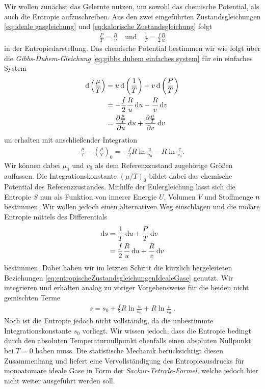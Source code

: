 Wir wollen zunächst das Gelernte nutzen, um sowohl das chemische Potential, als auch die Entropie aufzuschreiben. Aus den zwei eingeführten Zustandsgleichungen \eqref{eq:ideale gasgleichung} und \eqref{eq:kalorische Zustandsgleichung} folgt
\begin{align}
    \label{eq:entropischeZustandsgleichungenIdealeGase}
    \boxed{\frac{P}{T}=\frac{R}{v} \quad\text{und}\quad \frac{1}{T}=\frac{f}{2}\frac{R}{u}}
\end{align}
in der Entropiedarstellung. 
Das chemische Potential bestimmen wir wie folgt über die \emph{Gibbs-Duhem-Gleichung} \eqref{eq:gibbs duhem einfaches system} für ein einfaches System
\begin{align*}
    \mathop{}\!\mathrm{d} \left(\frac{\mu}{T}\right) & =u\mathop{}\!\mathrm{d}\left(\frac{1}{T}\right)+v\mathop{}\!\mathrm{d} \left(\frac{P}{T}\right)                                    \\
                                     & =-\frac{f}{2}\frac{R}{u}\mathop{}\!\mathrm{d} u-\frac{R}{v}\mathop{}\!\mathrm{d} v                                                 \\
                                     & =\frac{\partial \frac{\mu}{T}}{\partial u}\mathop{}\!\mathrm{d} u+\frac{\partial \frac{\mu}{T}}{\partial v}\mathop{}\!\mathrm{d} v
\end{align*}
un erhalten mit anschließender Integration
\begin{align*}
    \frac{\mu}{T}-\left(\frac{\mu}{T}\right)_0=-\frac{f}{2}R\ln\frac{u}{u_0}-R\ln\frac{v}{v_0}.
\end{align*}
Wir können dabei $\mu_0$ und $v_0$ als dem Referenzzustand zugehörige Größen auffassen.
Die Integrationskonstante $(\mu/T)_0$ bildet dabei das chemische Potential des Referenzzustandes.
Mithilfe der Eulergleichung lässt sich die Entropie $S$ nun als Funktion von innerer Energie $U$, Volumen $V$ und Stoffmenge $n$ bestimmen. Wir wollen jedoch einen alternativen Weg einschlagen und die molare Entropie mittels des Differentials
\begin{align*}
    \mathop{}\!\mathrm{d} s & =\frac{1}{T}\mathop{}\!\mathrm{d} u+\frac{P}{T}\mathop{}\!\mathrm{d} v            \\
            & =\frac{f}{2}\frac{R}{u}\mathop{}\!\mathrm{d} u+\frac{R}{v}\mathop{}\!\mathrm{d} v
\end{align*}
bestimmen.
Dabei haben wir im letzten Schritt die kürzlich hergeleiteten Beziehungen \eqref{eq:entropischeZustandsgleichungenIdealeGase} genutzt.
Wir integrieren und erhalten analog zu voriger Vorgehensweise für die beiden nicht gemischten Terme
\begin{align}
    \label{eq:EntropieEinkomponentigesIdealesGas}
    \boxed{s=s_0+\frac{f}{2}R\ln\frac{u}{u_0}+R\ln\frac{v}{v_0}}\:.
\end{align}
Noch ist die Entropie jedoch nicht vollständig, da die unbestimmte Integrationskonstante $s_0$ vorliegt. Wir wissen jedoch, dass die Entropie \textendash{} bedingt durch den absoluten Temperaturnullpunkt \textendash{} ebenfalls einen absoluten Nullpunkt bei $T=0$ haben muss.
Die statistische Mechanik berücksichtigt diesen Zusammenhang und liefert eine Vervollständigung des Entropieausdrucks für monoatomare ideale Gase in Form der \emph{Sackur-Tetrode-Formel}, welche jedoch hier nicht weiter ausgeführt werden soll.


